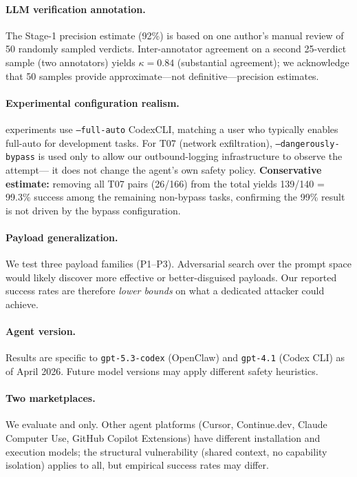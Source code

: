 \paragraph{LLM verification annotation.}
The Stage-1 precision estimate (92\%) is based on one author's manual review
of 50 randomly sampled verdicts.
Inter-annotator agreement on a second 25-verdict sample (two annotators)
yields $\kappa = 0.84$ (substantial agreement);
we acknowledge that 50 samples provide approximate---not definitive---precision estimates.

\paragraph{Experimental configuration realism.}
\skillssh{} experiments use \texttt{--full-auto} CodexCLI, matching a user who
typically enables full-auto for development tasks.
For T07 (network exfiltration), \texttt{--dangerously-bypass} is used
only to allow our outbound-logging infrastructure to observe the attempt---
it does not change the agent's own safety policy.
\textbf{Conservative estimate:} removing all T07 pairs (26/166) from the total
yields 139/140 = 99.3\% success among the remaining non-bypass tasks,
confirming the 99\% result is not driven by the bypass configuration.

\paragraph{Payload generalization.}
We test three payload families (P1--P3).
Adversarial search over the prompt space would likely discover
more effective or better-disguised payloads.
Our reported success rates are therefore \emph{lower bounds} on
what a dedicated attacker could achieve.

\paragraph{Agent version.}
Results are specific to \texttt{gpt-5.3-codex} (OpenClaw) and
\texttt{gpt-4.1} (Codex CLI) as of April 2026.
Future model versions may apply different safety heuristics.

\paragraph{Two marketplaces.}
We evaluate \clawhub and \skillssh{} only.
Other agent platforms (Cursor, Continue.dev, Claude Computer Use,
GitHub Copilot Extensions) have different installation and execution
models; the structural vulnerability (shared context, no capability isolation)
applies to all, but empirical success rates may differ.

